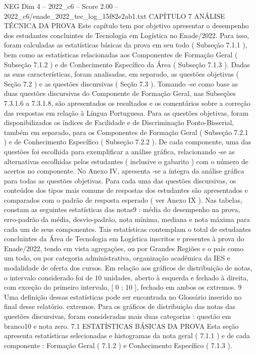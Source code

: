 \begin{textsample}{NEG Dim 4 – 2022\_c6 – Score 2.00 – 2022\_c6/enade\_2022\_tec\_log\_15f82e2ab1.txt}  \label{ex:f4_neg_270}
CAPÍTULO 7 ANÁLISE TÉCNICA DA PROVA Este capítulo tem por objetivo apresentar o desempenho dos estudantes concluintes de Tecnologia em Logística no Enade/2022.
Para isso, foram calculadas as estatísticas básicas da prova em seu todo ( Subseção 7.1.1 ), bem como as estatísticas relacionadas aos Componentes de Formação Geral ( Subseção 7.1.2 ) e de Conhecimento Específico da Área ( Subseção 7.1.3 ).
Dadas as suas características, foram analisadas, em separado, as questões objetivas ( Seção 7.2 ) e as questões discursivas ( Seção 7.3 ).
Tomando -se como base as duas questões discursivas do Componente de Formação Geral, nas Subseções 7.3.1.6 a 7.3.1.8, são apresentados os resultados e os comentários sobre a correção das respostas em relação à Língua Portuguesa.
Para as questões objetivas, foram disponibilizados os índices de Facilidade e de Discriminação Ponto-Bisserial, também em separado, para os Componentes de Formação Geral ( Subseção 7.2.1 ) e de Conhecimento Específico ( Subseção 7.2.2 ).
De cada componente, uma das questões foi escolhida para exemplificar a análise gráfica, relacionando -se as alternativas escolhidas pelos estudantes ( inclusive o gabarito ) com o número de acertos no componente.
No Anexo IV, apresenta -se a íntegra da análise gráfica para todas as questões objetivas.
Para cada uma das questões discursivas, os conteúdos dos tipos mais comuns de respostas dos estudantes são apresentados e comparados com o padrão de resposta esperado ( ver Anexo IX ).
Nas tabelas, constam as seguintes estatísticas das notas9 : média do desempenho na prova, erro-padrão da média, desvio-padrão, nota mínima, mediana e nota máxima para cada um de seus componentes.
Tais estatísticas contemplam o total de estudantes concluintes da Área de Tecnologia em Logística inscritos e presentes à prova do Enade/2022, tendo em vista agregações, ou por Grandes Regiões e o país como um todo, ou por categoria administrativa, organização acadêmica da IES e modalidade de oferta dos cursos.
Em relação aos gráficos de distribuição de notas, o intervalo considerado foi de 10 unidades, aberto à esquerda e fechado à direita, com exceção do primeiro intervalo, [ 0 ; 10 ], fechado em ambos os extremos. 9 Uma definição dessas estatísticas pode ser encontrada no Glossário inserido no final desse relatório. extremos.
Para os gráficos de distribuição das notas das questões discursivas, foram consideradas mais duas categorias : questão em branco10 e nota zero. 7.1 ESTATÍSTICAS BÁSICAS DA PROVA Esta seção apresenta estatísticas selecionadas e histogramas da nota geral ( 7.1.1 ) e de cada componente : Formação Geral ( 7.1.2 ) e Conhecimento Específico ( 7.1.3 ).

\end{textsample}

